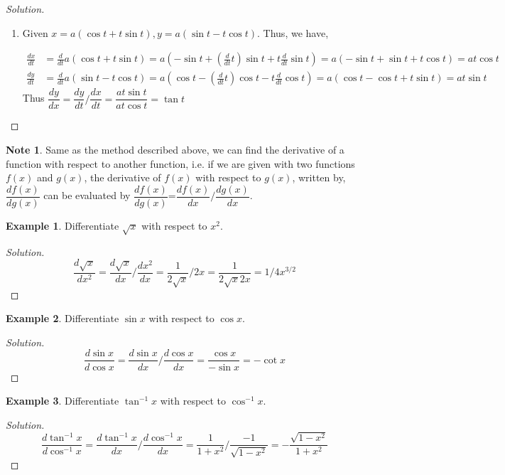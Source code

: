 \documentclass[../../main.tex]{subfiles}
\theoremstyle{definition}
\newtheorem{example}{Example}[section]
\newtheorem*{note}{Note}
\newenvironment{solution}
    {\begin{proof}[Solution]}
    {\end{proof}}
\begin{document}
\begin{solution}
\begin{enumerate}[label=(\roman*)]
\item Given $x=a(\cos t+t\sin t), y=a(\sin t-t\cos t)$. Thus, we have,

\begin{align*}
\frac{dx}{dt}&=\frac{d}{dt}a(\cos t+t\sin t)=a(-\sin t+(\frac{d}{dt}t)\sin t+t\frac{d}{dt}\sin t)=a(-\sin t+\sin t+t\cos t)=at\cos t \\
\frac{dy}{dt}&=\frac{d}{dt}a(\sin t-t\cos t)
=a(\cos t-(\frac{d}{dt}t)\cos t-t\frac{d}{dt}\cos t)=a(\cos t-\cos t+t\sin t)=at\sin t
\end{align*}
Thus $\dfrac{dy}{dx}=\dfrac{dy}{dt}/\dfrac{dx}{dt}=\dfrac{at \sin t}{at \cos t}= \tan t$
\end{enumerate}
\end{solution}
 
\begin{note}
Same as the method described above, we can find the derivative of a function with respect to another function, i.e. if we are given with two functions $f(x)$ and $g(x)$, the derivative of $f(x)$ with respect to $g(x)$, written by, $\dfrac{df(x)}{dg(x)}$ can be evaluated by $\dfrac{df(x)}{dg(x)}$=$\dfrac{df(x)}{dx}/\dfrac{dg(x)}{dx}$.    
\end{note}

\begin{example}
Differentiate $\sqrt{x}$ with respect to $x^2$.
\end{example}

\begin{solution}
\[
\frac{d\sqrt{x}}{dx^2} = \frac{d\sqrt{x}}{dx}/\frac{dx^2}{dx} = \frac{1}{2\sqrt{x}}/2x = \frac{1}{2\sqrt{x}2x} = 1/4x^{3/2} 
\]
\end{solution}


\begin{example}
Differentiate $\sin x$ with respect to $\cos x$.    
\end{example}

\begin{solution}
\[
\frac{d\sin x}{d\cos x} = \frac{d\sin x}{dx}/\frac{d\cos x}{dx} = \frac{\cos x}{-\sin x}=-\cot x
\]
\end{solution}

\begin{example}
Differentiate $\tan^{-1}x$ with respect to $\cos^{-1} x$.
\end{example}

\begin{solution}
\[
\frac{d\tan^{-1}x}{d\cos^{-1} x} = \frac{d\tan^{-1}x}{dx}/\frac{d\cos^{-1} x}{dx} = \frac{1}{1+x^2}/\frac{-1}{\sqrt{1-x^2}} = -\frac{\sqrt{1-x^2}}{1+x^2}
\]

\end{solution}
\end{document}

